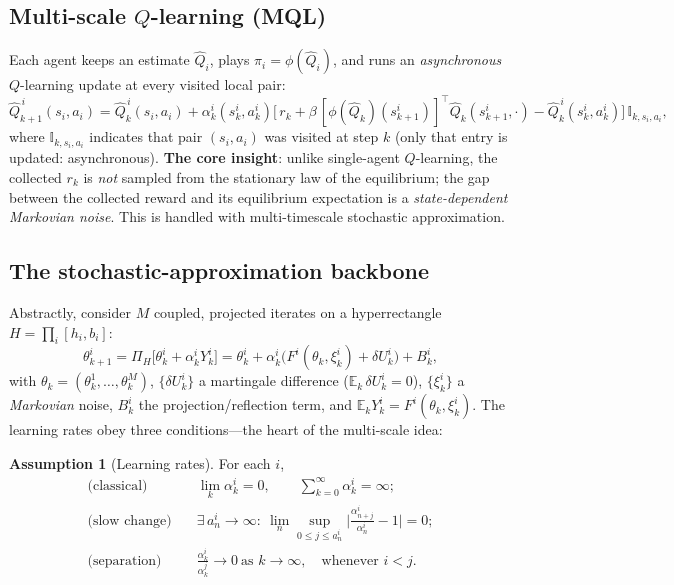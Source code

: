 \documentclass[11pt]{article}
\theoremstyle{plain}
\theoremstyle{definition}
\newtheorem{assumption}{Assumption}
\newcommand{\E}{\mathbb{E}}
\newcommand{\Qhat}{\hat{Q}}
\begin{document}
\subsection{Multi-scale $Q$-learning (MQL)}

Each agent keeps an estimate $\Qhat_i$, plays $\pi_i=\phi(\Qhat_i)$, and runs an
\emph{asynchronous} $Q$-learning update at every visited local pair:
\begin{equation}
  \Qhat^{\,i}_{k+1}(s_i,a_i)
  = \Qhat^{\,i}_{k}(s_i,a_i)
  + \alpha^i_k(s^i_k,a^i_k)\Big[\, r_k
     + \beta\,[\phi(\Qhat_k)(s^i_{k+1})]^{\top}\Qhat_k(s^i_{k+1},\cdot)
     - \Qhat^{\,i}_k(s^i_k,a^i_k)\Big]\,\mathbb{I}_{k,s_i,a_i},
  \label{eq:mql}
\end{equation}
where $\mathbb{I}_{k,s_i,a_i}$ indicates that pair $(s_i,a_i)$ was visited at
step $k$ (only that entry is updated: asynchronous). \textbf{The core insight}:
unlike single-agent $Q$-learning, the collected $r_k$ is \emph{not} sampled
from the stationary law of the equilibrium; the gap between the collected
reward and its equilibrium expectation is a \emph{state-dependent Markovian
noise}. This is handled with multi-timescale stochastic approximation.

\subsection{The stochastic-approximation backbone}
\label{sec:sabackbone}

Abstractly, consider $M$ coupled, projected iterates on a hyperrectangle
$H=\prod_{i}[h_i,b_i]$:
\begin{equation}
  \theta^i_{k+1}
  = \Pi_H\!\big[\theta^i_k + \alpha^i_k Y^i_k\big]
  = \theta^i_k + \alpha^i_k\big(F^i(\theta_k,\xi^i_k) + \delta U^i_k\big) + B^i_k,
  \label{eq:saiterate}
\end{equation}
with $\theta_k=(\theta^1_k,\dots,\theta^M_k)$, $\{\delta U^i_k\}$ a martingale
difference ($\E_k\,\delta U^i_k=0$), $\{\xi^i_k\}$ a \emph{Markovian} noise,
$B^i_k$ the projection/reflection term, and $\E_k Y^i_k=F^i(\theta_k,\xi^i_k)$.
The learning rates obey three conditions---the heart of the multi-scale idea:

\begin{assumption}[Learning rates]
\label{as:rates}
For each $i$,
\begin{align}
  \text{(classical)}\quad & \lim_k \alpha^i_k = 0, \qquad
    \sum_{k=0}^{\infty}\alpha^i_k = \infty; \label{eq:classical}\\
  \text{(slow change)}\quad & \exists\, a^i_n\to\infty:\
    \lim_n \sup_{0\le j\le a^i_n}\Big|\tfrac{\alpha^i_{n+j}}{\alpha^i_n}-1\Big|=0;
    \label{eq:slow}\\
  \text{(separation)}\quad & \frac{\alpha^i_k}{\alpha^j_k}\to 0
    \ \text{as } k\to\infty,\quad \text{whenever } i<j. \label{eq:sep}
\end{align}
\end{assumption}
\end{document}

